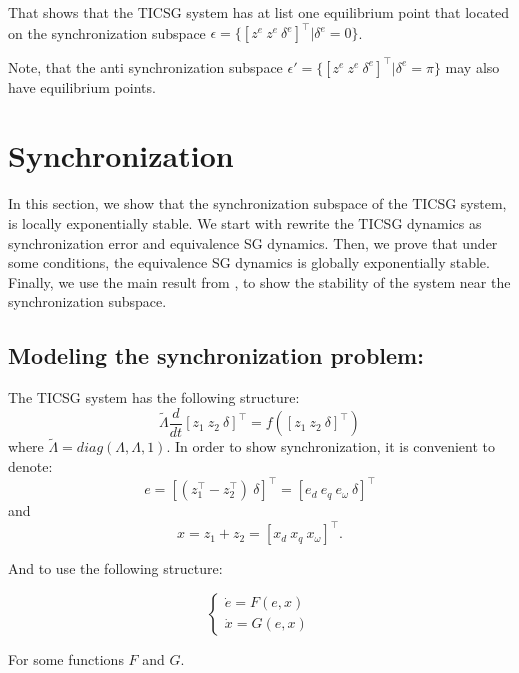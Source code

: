 \documentclass[letterpaper, 10 pt, conference]{ieeeconf}  %
\begin{document}
That shows that the TICSG system has at list one equilibrium point  that located on the synchronization subspace 
$\epsilon=\{ \left[z^e \ z^e \ \delta^e  \right]^\top   |  \delta^e= 0\}$.

Note, that the anti synchronization subspace  $\epsilon '=\{ \left[z^e \ z^e \ \delta^e  \right]^\top   |  \delta^e=\pi \}$ may also have equilibrium points.

\section{Synchronization}

In this section, we show that the synchronization subspace of the TICSG system, is locally exponentially stable.
We start with rewrite the TICSG dynamics as synchronization error
 and equivalence SG dynamics. Then, we  prove that under
some conditions, the equivalence SG dynamics is globally exponentially
stable. Finally, we use the main result from  \cite{AndrieuJayawardhanaPraly},
to show the stability of the system near the synchronization subspace.

\subsection{Modeling the synchronization problem:}
The TICSG system has the following structure:
$$ \tilde{\Lambda}\frac{d}{dt}\left[z_1\ z_2\ \delta\right]^{\top}= f\left( \left[z_1\ z_2\ \delta\right]^{\top} \right)$$
where $\tilde{\Lambda} = diag \left( \Lambda,\Lambda,1 \right) $.
In order to show synchronization, it is convenient to denote:
$$e =  \left[\left(z_1^\top-z_2^\top \right)\ \delta \right]^\top = \left[e_d\ e_q\ e_{\omega}\ \delta \right]^\top $$
and 
$$x =z_1+z_2 = \left[ x_d\ x_q\ x_\omega\right]^\top.$$  

And to use the following structure:

\begin{equation}
\left\{ \begin{array}{c}
\dot{e}=F(e,x)\\
\dot{x}=G(e,x)
\end{array}\right.\label{eq:sync_sestem}
\end{equation}

For some functions $F$ and $G$. 
\end{document}
